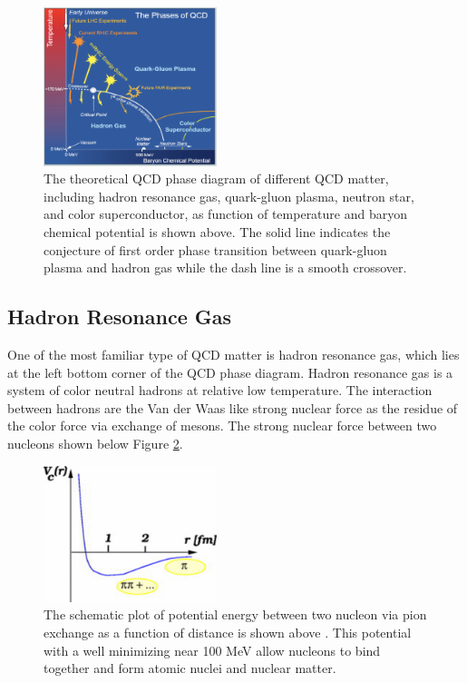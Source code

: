 \begin{figure}[hbtp]
\begin{center}
\includegraphics[width=0.45\textwidth]{Figures/Chapter1/QCDPhaseDiagram.png}
\caption{The theoretical QCD phase diagram of different QCD matter, including hadron resonance gas, quark-gluon plasma, neutron star, and color superconductor, as function of temperature and baryon chemical potential is shown above. The solid line indicates the conjecture of first order phase transition between quark-gluon plasma and hadron gas while the dash line is a smooth crossover.}
\label{QCDPhaseDiagram}
\end{center}
\end{figure} 

\subsection{Hadron Resonance Gas}

One of the most familiar type of QCD matter is hadron resonance gas, which lies at the left bottom corner of the QCD phase diagram. Hadron resonance gas is a system of color neutral hadrons at relative low temperature. The interaction between hadrons are the Van der Waas like strong nuclear force as the residue of the color force via exchange of mesons. The strong nuclear force between two nucleons shown below Figure \ref{NuclearForce}. 

\begin{figure}[hbtp]
\begin{center}
\includegraphics[width=0.45\textwidth]{Figures/Chapter1/NuclearForce.png}
\caption{The schematic plot of potential energy between two nucleon via pion exchange as a function of distance is shown above \cite{StrongNuclear}. This potential with a well minimizing near 100 MeV allow nucleons to bind together and form atomic nuclei and nuclear matter.}
\label{NuclearForce}
\end{center}
\end{figure} 

